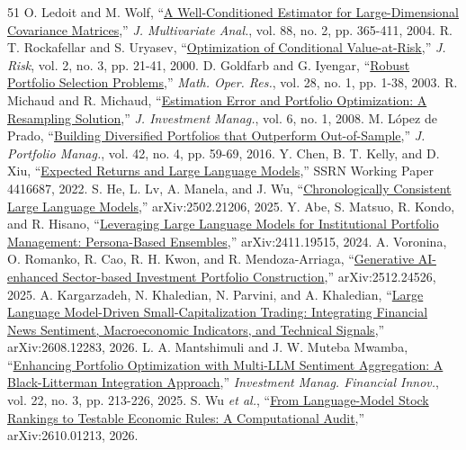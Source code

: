 \documentclass[conference]{IEEEtran}
\begin{document}
{\begin{thebibliography}{51}
 O. Ledoit and M. Wolf, ``\href{https://econpapers.repec.org/RePEc:eee:jmvana:v:88:y:2004:i:2:p:365-411}{A Well-Conditioned Estimator for Large-Dimensional Covariance Matrices},'' \textit{J. Multivariate Anal.}, vol. 88, no. 2, pp. 365-411, 2004.
 R. T. Rockafellar and S. Uryasev, ``\href{https://www.risk.net/journal-risk/2161159/optimization-conditional-value-risk}{Optimization of Conditional Value-at-Risk},'' \textit{J. Risk}, vol. 2, no. 3, pp. 21-41, 2000.
 D. Goldfarb and G. Iyengar, ``\href{https://zhaosong-lu.github.io/ResearchPapers/robport-OMS.pdf}{Robust Portfolio Selection Problems},'' \textit{Math. Oper. Res.}, vol. 28, no. 1, pp. 1-38, 2003.
 R. Michaud and R. Michaud, ``\href{https://joim.com/articles-estimation-error-portfolio-optimization-resampling-solution}{Estimation Error and Portfolio Optimization: A Resampling Solution},'' \textit{J. Investment Manag.}, vol. 6, no. 1, 2008.
 M. L\'opez de Prado, ``\href{https://papers.ssrn.com/abstract=2708678}{Building Diversified Portfolios that Outperform Out-of-Sample},'' \textit{J. Portfolio Manag.}, vol. 42, no. 4, pp. 59-69, 2016.
 Y. Chen, B. T. Kelly, and D. Xiu, ``\href{https://papers.ssrn.com/sol3/papers.cfm?abstract_id=4416687}{Expected Returns and Large Language Models},'' SSRN Working Paper 4416687, 2022.
 S. He, L. Lv, A. Manela, and J. Wu, ``\href{https://arxiv.org/abs/2502.21206}{Chronologically Consistent Large Language Models},'' arXiv:2502.21206, 2025.
 Y. Abe, S. Matsuo, R. Kondo, and R. Hisano, ``\href{https://arxiv.org/abs/2411.19515}{Leveraging Large Language Models for Institutional Portfolio Management: Persona-Based Ensembles},'' arXiv:2411.19515, 2024.
 A. Voronina, O. Romanko, R. Cao, R. H. Kwon, and R. Mendoza-Arriaga, ``\href{https://arxiv.org/abs/2512.24526}{Generative AI-enhanced Sector-based Investment Portfolio Construction},'' arXiv:2512.24526, 2025.
 A. Kargarzadeh, N. Khaledian, N. Parvini, and A. Khaledian, ``\href{https://arxiv.org/abs/2608.12283}{Large Language Model-Driven Small-Capitalization Trading: Integrating Financial News Sentiment, Macroeconomic Indicators, and Technical Signals},'' arXiv:2608.12283, 2026.
 L. A. Mantshimuli and J. W. Muteba Mwamba, ``\href{https://doi.org/10.21511/imfi.22(3).2025.16}{Enhancing Portfolio Optimization with Multi-LLM Sentiment Aggregation: A Black-Litterman Integration Approach},'' \textit{Investment Manag. Financial Innov.}, vol. 22, no. 3, pp. 213-226, 2025.
 S. Wu \textit{et al.}, ``\href{https://arxiv.org/abs/2610.01213}{From Language-Model Stock Rankings to Testable Economic Rules: A Computational Audit},'' arXiv:2610.01213, 2026.

\end{thebibliography}}
\end{document}
